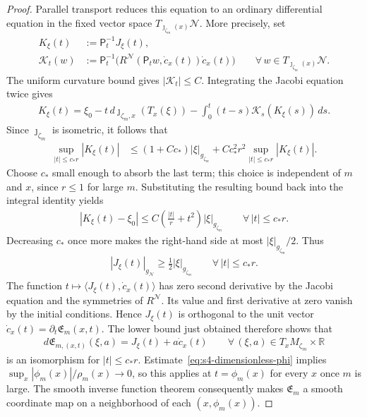 \documentclass[a4paper,11pt,oneside,reqno]{amsart}
\numberwithin{equation}{section}
\theoremstyle{definition}
\begin{document}
\begin{proof}
    Parallel transport reduces this equation to an ordinary
    differential equation in the fixed vector space
    $T_{\jmath_{\zeta_m}(x)}\mathcal N$. More precisely, set
    \begin{align*}
        K_\xi(t)&:=\mathsf P_t^{-1}J_\xi(t),\\
        \mathcal K_t(w)
        &:=\mathsf P_t^{-1}
          \bigl(R^{\mathcal N}(\mathsf P_t w,\dot c_x(t))
          \dot c_x(t)\bigr)
          \qquad\forall\,w\in T_{\jmath_{\zeta_m}(x)}\mathcal N.
    \end{align*}
    The uniform curvature bound gives $|\mathcal K_t|\leq C$.
    Integrating the Jacobi equation twice gives
    \begin{align*}
        K_\xi(t)
        =\xi_0-t\,d\jmath_{\zeta_m,x}(T_x(\xi))
          -\int_0^t(t-s)\mathcal K_s(K_\xi(s))\,ds.
    \end{align*}
    Since $\jmath_{\zeta_m}$ is isometric, it follows that
    \begin{align*}
        \sup_{|t|\leq c_*r}|K_\xi(t)|
        &\leq (1+Cc_*)|\xi|_{g_{\zeta_m}}
          +Cc_*^2r^2
             \sup_{|t|\leq c_*r}|K_\xi(t)|.
    \end{align*}
    Choose $c_*$ small enough to absorb the last term; this
    choice is independent of $m$ and $x$, since $r\leq1$
    for large $m$. Substituting the resulting bound back into
    the integral identity yields
    \begin{align*}
        |K_\xi(t)-\xi_0|
        \leq C\left(\frac{|t|}{r}+t^2\right)
             |\xi|_{g_{\zeta_m}}
        \qquad\forall\,|t|\leq c_*r.
    \end{align*}
    Decreasing $c_*$ once more makes the right-hand side at
    most $|\xi|_{g_{\zeta_m}}/2$. Thus
    \begin{align*}
        |J_\xi(t)|_{g_{\mathcal N}}
        \geq\tfrac12|\xi|_{g_{\zeta_m}}
        \qquad\forall\,|t|\leq c_*r.
    \end{align*}
    The function $t\mapsto\langle J_\xi(t),\dot c_x(t)\rangle$
    has zero second derivative by the Jacobi equation and
    the symmetries of $R^{\mathcal N}$. Its value and first
    derivative at zero vanish by the initial conditions.
    Hence $J_\xi(t)$ is orthogonal to the unit vector
    $\dot c_x(t)=\partial_t\mathfrak E_m(x,t)$.
    The lower bound just obtained therefore shows that
    \begin{align*}
        d\mathfrak E_{m,(x,t)}(\xi,a)
        =J_\xi(t)+a\dot c_x(t)
        \qquad\forall\,(\xi,a)\in T_xM_{\zeta_m}\times\mathbb R
    \end{align*}
    is an isomorphism for $|t|\leq c_*r$.
    Estimate~\eqref{eq:s4-dimensionless-phi} implies
    $\sup_x|\phi_m(x)|/\rho_m(x)\to0$, so this applies
    at $t=\phi_m(x)$ for every $x$ once $m$ is large.
    The smooth inverse function theorem consequently makes
    $\mathfrak E_m$ a smooth coordinate map on a neighborhood
    of each $(x,\phi_m(x))$.


\end{proof}
\end{document}
